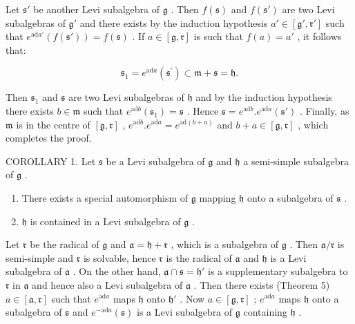 Let \(\mathfrak{s}'\) be another Levi subalgebra of \(\mathfrak{g}\) . Then \(f(\mathfrak{s})\) and \(f(\mathfrak{s}')\) are two Levi subalgebras of \(\mathfrak{g}'\) and there exists by the induction hypothesis \(a' \in [\mathfrak{g}', \mathfrak{r}']\) such that \(e^{\mathrm{ad} a'}(f(\mathfrak{s}')) = f(\mathfrak{s})\) . If \(a \in [\mathfrak{g}, \mathfrak{r}]\) is such that \(f(a) = a'\) , it follows that:

\[
\mathfrak {s} _ {1} = e ^ {\mathrm{ad} a} \left(\mathfrak {s} ^ {\prime}\right) \subset \mathfrak {m} + \mathfrak {s} = \mathfrak {h}.
\]

Then \(\mathfrak{s}_1\) and \(\mathfrak{s}\) are two Levi subalgebras of \(\mathfrak{h}\) and by the induction hypothesis there exists \(b\in \mathfrak{m}\) such that \(e^{\mathrm{ad}b}(\mathfrak{s}_1) = \mathfrak{s}\) . Hence \(\mathfrak{s} = e^{\mathrm{ad}b}.e^{\mathrm{ad}a}(\mathfrak{s}')\) . Finally, as \(\mathfrak{m}\) is in the centre of \([\mathfrak{g},\mathfrak{r}]\) , \(e^{\mathrm{ad}b}.e^{\mathrm{ad}a} = e^{\mathrm{ad}(b + a)}\) and \(b + a\in [\mathfrak{g},\mathfrak{r}]\) , which completes the proof.

COROLLARY 1. Let \(\mathfrak{s}\) be a Levi subalgebra of \(\mathfrak{g}\) and \(\mathfrak{h}\) a semi-simple subalgebra of \(\mathfrak{g}\) .

\begin{enumerate}
\def\labelenumi{(\alph{enumi})}
\item
  There exists a special automorphism of \(\mathfrak{g}\) mapping \(\mathfrak{h}\) onto a subalgebra of \(\mathfrak{s}\) .
\item
  \(\mathfrak{h}\) is contained in a Levi subalgebra of \(\mathfrak{g}\) .
\end{enumerate}

Let \(\mathfrak{r}\) be the radical of \(\mathfrak{g}\) and \(\mathfrak{a} = \mathfrak{h} + \mathfrak{r}\) , which is a subalgebra of \(\mathfrak{g}\) . Then \(\mathfrak{a}/\mathfrak{r}\) is semi-simple and \(\mathfrak{r}\) is solvable, hence \(\mathfrak{r}\) is the radical of \(\mathfrak{a}\) and \(\mathfrak{h}\) is a Levi subalgebra of \(\mathfrak{a}\) . On the other hand, \(\mathfrak{a} \cap \mathfrak{s} = \mathfrak{h}'\) is a supplementary subalgebra to \(\mathfrak{r}\) in \(\mathfrak{a}\) and hence also a Levi subalgebra of \(\mathfrak{a}\) . Then there exists (Theorem 5) \(a \in [\mathfrak{a}, \mathfrak{r}]\) such that \(e^{\mathrm{ad} a}\) maps \(\mathfrak{h}\) onto \(\mathfrak{h}'\) . Now \(a \in [\mathfrak{g}, \mathfrak{r}]\) ; \(e^{\mathrm{ad} a}\) maps \(\mathfrak{h}\) onto a subalgebra of \(\mathfrak{s}\) and \(e^{-\mathrm{ad} a}(\mathfrak{s})\) is a Levi subalgebra of \(\mathfrak{g}\) containing \(\mathfrak{h}\) .

